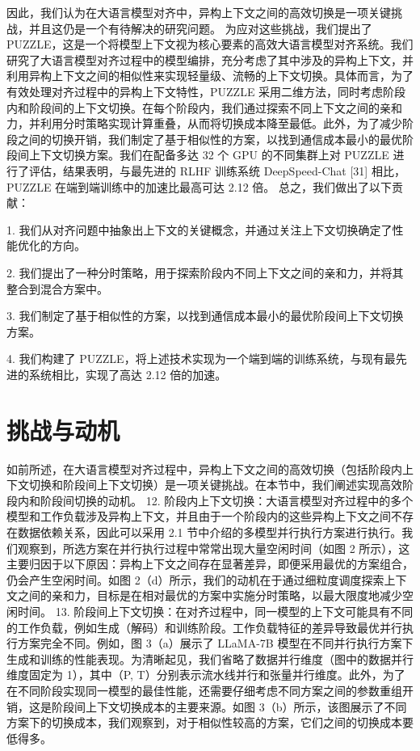 因此，我们认为在大语言模型对齐中，异构上下文之间的高效切换是一项关键挑战，并且这仍是一个有待解决的研究问题。 
为应对这些挑战，我们提出了 PUZZLE，这是一个将模型上下文视为核心要素的高效大语言模型对齐系统。我们研究了大语言模型对齐过程中的模型编排，充分考虑了其中涉及的异构上下文，并利用异构上下文之间的相似性来实现轻量级、流畅的上下文切换。具体而言，为了有效处理对齐过程中的异构上下文特性，PUZZLE 采用二维方法，同时考虑阶段内和阶段间的上下文切换。在每个阶段内，我们通过探索不同上下文之间的亲和力，并利用分时策略实现计算重叠，从而将切换成本降至最低。此外，为了减少阶段之间的切换开销，我们制定了基于相似性的方案，以找到通信成本最小的最优阶段间上下文切换方案。我们在配备多达 32 个 GPU 的不同集群上对 PUZZLE 进行了评估，结果表明，与最先进的 RLHF 训练系统 DeepSpeed-Chat [31] 相比，PUZZLE 在端到端训练中的加速比最高可达 2.12 倍。 
总之，我们做出了以下贡献： 

1.	我们从对齐问题中抽象出上下文的关键概念，并通过关注上下文切换确定了性能优化的方向。 

2.	我们提出了一种分时策略，用于探索阶段内不同上下文之间的亲和力，并将其整合到混合方案中。 

3.	我们制定了基于相似性的方案，以找到通信成本最小的最优阶段间上下文切换方案。 

4.	我们构建了 PUZZLE，将上述技术实现为一个端到端的训练系统，与现有最先进的系统相比，实现了高达 2.12 倍的加速。 


\section{挑战与动机}
如前所述，在大语言模型对齐过程中，异构上下文之间的高效切换（包括阶段内上下文切换和阶段间上下文切换）是一项关键挑战。在本节中，我们阐述实现高效阶段内和阶段间切换的动机。 
12.	阶段内上下文切换：大语言模型对齐过程中的多个模型和工作负载涉及异构上下文，并且由于一个阶段内的这些异构上下文之间不存在数据依赖关系，因此可以采用 2.1 节中介绍的多模型并行执行方案进行执行。我们观察到，所选方案在并行执行过程中常常出现大量空闲时间（如图 2 所示），这主要归因于以下原因：异构上下文之间存在显著差异，即便采用最优的方案组合，仍会产生空闲时间。如图 2（d）所示，我们的动机在于通过细粒度调度探索上下文之间的亲和力，目标是在相对最优的方案中实施分时策略，以最大限度地减少空闲时间。 
13.	阶段间上下文切换：在对齐过程中，同一模型的上下文可能具有不同的工作负载，例如生成（解码）和训练阶段。工作负载特征的差异导致最优并行执行方案完全不同。例如，图 3（a）展示了 LLaMA-7B 模型在不同并行执行方案下生成和训练的性能表现。为清晰起见，我们省略了数据并行维度（图中的数据并行维度固定为 1），其中（P, T）分别表示流水线并行和张量并行维度。此外，为了在不同阶段实现同一模型的最佳性能，还需要仔细考虑不同方案之间的参数重组开销，这是阶段间上下文切换成本的主要来源。如图 3（b）所示，该图展示了不同方案下的切换成本，我们观察到，对于相似性较高的方案，它们之间的切换成本要低得多。 


